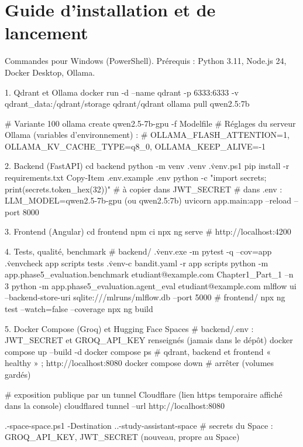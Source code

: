 \documentclass[12pt,a4paper]{report}
\begin{document}
\chapter{Guide d'installation et de lancement}
\label{ann:installation}

Commandes pour Windows (PowerShell). Prérequis : Python 3.11, Node.js 24, Docker Desktop, Ollama.

\begin{prompt}{1. Qdrant et Ollama}
docker run -d --name qdrant -p 6333:6333 -v qdrant_data:/qdrant/storage qdrant/qdrant
ollama pull qwen2.5:7b

# Variante 100 %
ollama create qwen2.5-7b-gpu -f Modelfile
# Réglages du serveur Ollama (variables d'environnement) :
#   OLLAMA_FLASH_ATTENTION=1, OLLAMA_KV_CACHE_TYPE=q8_0, OLLAMA_KEEP_ALIVE=-1
\end{prompt}

\begin{prompt}{2. Backend (FastAPI)}
cd backend
python -m venv .venv
.\.venv\Scripts\Activate.ps1
pip install -r requirements.txt
Copy-Item .env.example .env
python -c "import secrets; print(secrets.token_hex(32))"   # à copier dans JWT_SECRET
# dans .env : LLM_MODEL=qwen2.5-7b-gpu (ou qwen2.5:7b)
uvicorn app.main:app --reload --port 8000
\end{prompt}

\begin{prompt}{3. Frontend (Angular)}
cd frontend
npm ci
npx ng serve          # http://localhost:4200
\end{prompt}

\begin{prompt}{4. Tests, qualité, benchmark}
# backend/
.\.venv\Scripts\python.exe -m pytest -q --cov=app
.\.venv\Scripts\ruff check app scripts tests
.\.venv\Scripts\bandit -c bandit.yaml -r app scripts
python -m app.phase5_evaluation.benchmark etudiant@example.com Chapter1_Part_1 --n 3
python -m app.phase5_evaluation.agent_eval etudiant@example.com
mlflow ui --backend-store-uri sqlite:///mlruns/mlflow.db --port 5000
# frontend/
npx ng test --watch=false --coverage
npx ng build
\end{prompt}

\begin{prompt}{5. Docker Compose (Groq) et Hugging Face Spaces}
# backend/.env : JWT_SECRET et GROQ_API_KEY renseignés (jamais dans le dépôt)
docker compose up --build -d
docker compose ps          # qdrant, backend et frontend « healthy » ; http://localhost:8080
docker compose down        # arrêter (volumes gardés)

# exposition publique par un tunnel Cloudflare (lien https temporaire affiché dans la console)
cloudflared tunnel --url http://localhost:8080

.\deploy\hf-space\prepare-space.ps1 -Destination ..\ai-study-assistant-space
# secrets du Space : GROQ_API_KEY, JWT_SECRET (nouveau, propre au Space)
\end{prompt}
\end{document}
